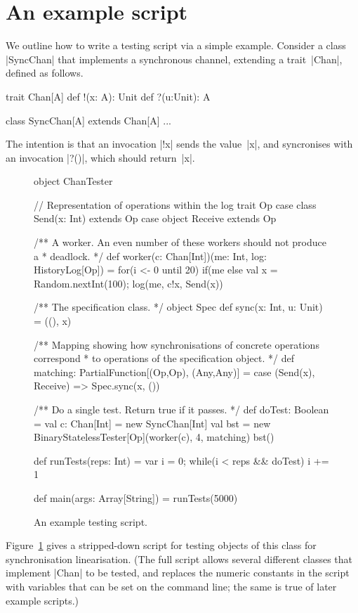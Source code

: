 \section{An example script}
\label{sec:example}

We outline how to write a testing script via a simple example.  Consider a
class |SyncChan| that implements a synchronous channel, extending a
trait~|Chan|, defined as follows.
%
\begin{scala}
trait Chan[A]{
  def !(x: A): Unit
  def ?(u:Unit): A
}

class SyncChan[A] extends Chan[A]{ ... }
\end{scala}
%
The intention is that an invocation |!x| sends the value~|x|, and syncronises
with an invocation |?()|, which should return~|x|.


\begin{figure}
\begin{scala}
object ChanTester{
  // Representation of operations within the log
  trait Op
  case class Send(x: Int) extends Op
  case object Receive extends Op

  /** A worker.  An even number of these workers should not produce a
    * deadlock. */
  def worker(c: Chan[Int])(me: Int, log: HistoryLog[Op]) = {
    for(i <- 0 until 20)
      if(me%
      else{ val x = Random.nextInt(100); log(me, c!x, Send(x)) }
  }

  /** The specification class. */
  object Spec{
    def sync(x: Int, u: Unit) = ((), x)
  } 

  /** Mapping showing how synchronisations of concrete operations correspond
    * to operations of the specification object. */
  def matching: PartialFunction[(Op,Op), (Any,Any)] = {
    case (Send(x), Receive) => Spec.sync(x, ()) 
  }

  /** Do a single test.  Return true if it passes. */
  def doTest: Boolean = {
    val c: Chan[Int] = new SyncChan[Int]
    val bst = new BinaryStatelessTester[Op](worker(c), 4, matching)
    bst()
  }

  def runTests(reps: Int) = {
    var i = 0; while(i < reps && doTest) i += 1
  }

  def main(args: Array[String]) = runTests(5000)
}
\end{scala}
\caption{An example testing script.\label{fig:script}}
\end{figure}


Figure~\ref{fig:script} gives a stripped-down script for testing objects of
this class for synchronisation linearisation.  (The full script allows several
different classes that implement |Chan| to be tested, and replaces the numeric
constants in the script with variables that can be set on the command line;
the same is true of later example scripts.)

